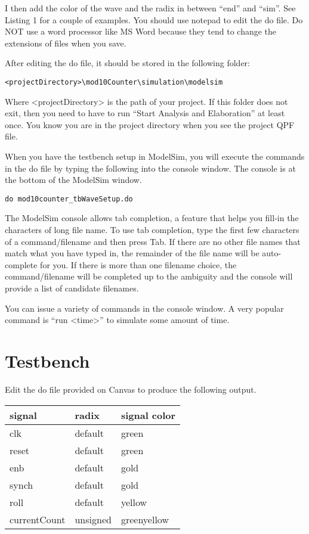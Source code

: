 I then add the color of the wave and the radix in between ``end'' and
``sim''. See Listing 1 for a couple of examples. You should use notepad
to edit the do file. Do NOT use a word processor like MS Word because
they tend to change the extensions of files when you save.

After editing the do file, it should be stored in the following folder:

\begin{verbatim}
<projectDirectory>\mod10Counter\simulation\modelsim
\end{verbatim}

Where \textless projectDirectory\textgreater{} is the path of your
project. If this folder does not exit, then you need to have to run
``Start Analysis and Elaboration'' at least once. You know you are in
the project directory when you see the project QPF file. 

When you have the testbench setup in ModelSim, you will
execute the commands in the do file by typing the 
following into the console window.  The console is at the
bottom of the ModelSim window.


\begin{verbatim}
do mod10counter_tbWaveSetup.do
\end{verbatim}

The ModelSim console allows tab completion, a feature that helps you
fill-in the characters of long file name. To use tab completion, type
the first few characters of a command/filename and then press Tab. If
there are no other file names that match what you have typed in, the
remainder of the file name will be auto-complete for you. If there is
more than one filename choice, the command/filename will be completed up
to the ambiguity and the console will provide a list of candidate
filenames.

You can issue a variety of commands in the console window.   A very popular
command is ``run \textless time\textgreater'' to simulate some amount
of time. 


\section{Testbench}
Edit the do file provided on Canvas to produce the following output.
\hypertarget{link:mod10DoFile}{}{}

\begin{tabular}{p{3cm}p{3cm}p{3cm}}
signal & radix & signal color \\ \hline
  clk 		& default 		& green  \\ 
  reset 	& default 		& green  \\ 
  enb 		& default 		& gold  \\ 
  synch 	& default 		& gold  \\ 
  roll 		& default 		& yellow  \\ 
  currentCount 	& unsigned & greenyellow  \\ 
\end{tabular}


